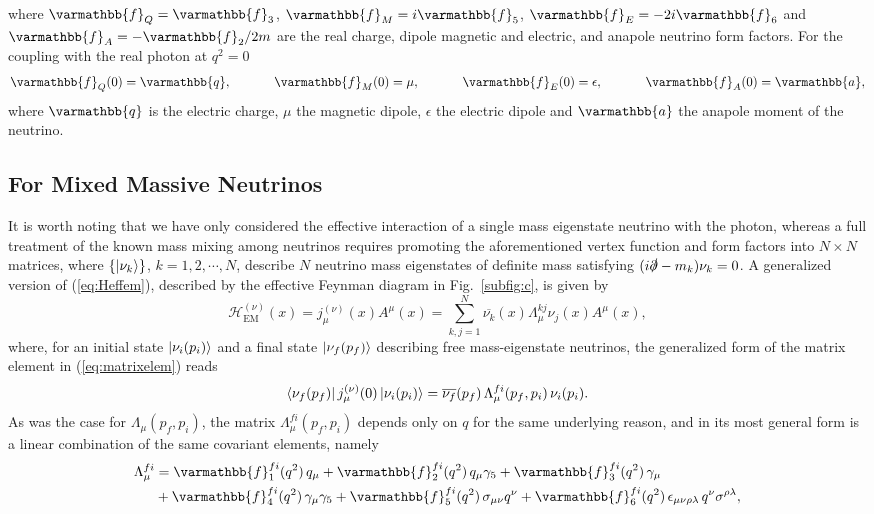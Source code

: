 where $\varmathbb{f}_Q = \varmathbb{f}_3$, $\varmathbb{f}_M = i\varmathbb{f}_5$, $\varmathbb{f}_E = -2i\varmathbb{f}_6$ and $\varmathbb{f}_A=-\varmathbb{f}_2/2m$ are the real charge, dipole magnetic and electric, and anapole neutrino form factors. For the coupling with the real photon at $q^2=0$
\begin{equation}
	\varmathbb{f}_Q(0) = \varmathbb{q},~~~~~~~~~~\varmathbb{f}_M(0) = \mu,~~~~~~~~~~\varmathbb{f}_E(0) = \epsilon,~~~~~~~~~~\varmathbb{f}_A(0) = \varmathbb{a},
\end{equation}
where $\varmathbb{q}$ is the electric charge, $\mu$ the magnetic dipole, $\epsilon$ the electric dipole and $\varmathbb{a}$ the anapole moment of the neutrino. 

\subsection{For Mixed Massive Neutrinos}
It is worth noting that we have only considered the effective interaction of a single mass eigenstate neutrino with the photon, whereas a full treatment of the known mass mixing among neutrinos requires promoting the aforementioned vertex function and form factors into $N\times N$ matrices, where $\{\ket{\nu_k}\}$, $k=1,2,\cdots,N$, describe $N$ neutrino mass eigenstates of definite mass satisfying $(i\slashed{\partial}-m_k)\nu_k=0$. A generalized version of (\ref{eq:Heffem}), described by the effective Feynman diagram in Fig.~\ref{subfig:c}, is given by
\begin{equation}\label{eq:Heffemkj}
\mathcal{H}^{(\nu)}_{\text{EM}}(x) = j^{(\nu)}_{\mu}(x)A^\mu(x) = \sum_{k,j=1}^{N}\overline{\nu_k}(x)\Lambda^{kj}_\mu\nu_j(x)A^\mu(x),
\end{equation}
where, for an initial state $\ket{\nu_i(p_i)}$ and a final state $\ket{\nu_f(p_f)}$ describing free mass-eigenstate neutrinos, the generalized form of the matrix element in (\ref{eq:matrixelem}) reads
\begin{equation}\label{eq:matrixelemfi}
\bra{\nu_f(p_f)}j^{(\nu)}_{\mu}(0)\ket{\nu_i(p_i)} = \overline{\nu_f}(p_f)\,\Lambda^{fi}_\mu(p_f,p_i)\,\nu_i(p_i).
\end{equation}
As was the case for $\Lambda_\mu(p_f,p_i)$, the matrix $\Lambda^{fi}_\mu(p_f,p_i)$ depends only on $q$ for the same underlying reason, and in its most general form is a linear combination of the same covariant elements, namely
\begin{equation}\label{eq:sixformfactorsfi}
\begin{split}
\Lambda^{fi}_\mu &= \varmathbb{f}^{fi}_1(q^2)\,q_\mu
+ \varmathbb{f}^{fi}_2(q^2)\,q_\mu\gamma_5
+ \varmathbb{f}^{fi}_3(q^2)\,\gamma_\mu\\
&+ \varmathbb{f}^{fi}_4(q^2)\,\gamma_\mu\gamma_5
+ \varmathbb{f}^{fi}_5(q^2)\,\sigma_{\mu\nu}q^{\nu}
+ \varmathbb{f}^{fi}_6(q^2)\,\epsilon_{\mu\nu\rho\lambda}\,q^{\nu}\sigma^{\rho\lambda},
\end{split}
\end{equation}
